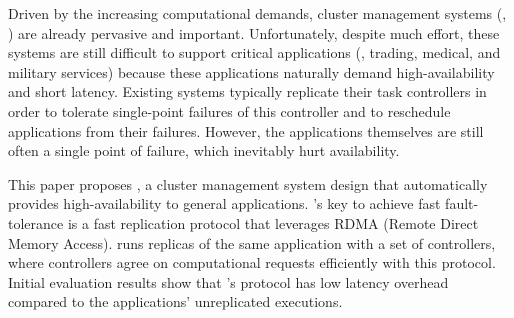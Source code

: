 
Driven by the increasing computational demands, cluster management systems 
(\eg, \mesos) are already pervasive and important. Unfortunately, despite much 
effort, these systems are still difficult to support critical applications 
(\eg, trading, medical, and military services) because these applications 
naturally demand high-availability and short latency. Existing systems 
typically replicate their task controllers in order to tolerate single-point 
failures of this controller and to reschedule applications from their failures. 
However, the applications themselves are still often a single point of failure, 
which inevitably hurt availability.


This paper proposes \xxx, a cluster management system design that automatically 
provides high-availability to general applications. \xxx's key to achieve fast 
fault-tolerance is a fast \paxos replication protocol that leverages RDMA 
(Remote Direct Memory Access). \xxx runs replicas of the same application with 
a set of controllers, where controllers agree on computational requests 
efficiently with this protocol. Initial evaluation results show that \xxx's 
protocol has low latency overhead compared to the applications' unreplicated 
executions.


